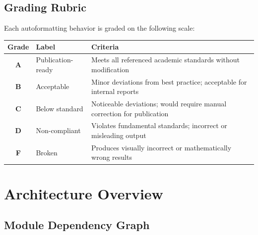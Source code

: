 \documentclass[11pt,a4paper]{article}
\begin{document}
\subsection{Grading Rubric}

Each autoformatting behavior is graded on the following scale:

\begin{center}
\begin{tabular}{c l p{7cm}}
\toprule
\textbf{Grade} & \textbf{Label} & \textbf{Criteria} \\
\midrule
\textcolor{okgreen}{\textbf{A}} & Publication-ready & Meets all referenced academic standards without modification \\
\textcolor{googblue}{\textbf{B}} & Acceptable & Minor deviations from best practice; acceptable for internal reports \\
\textcolor{warningyellow}{\textbf{C}} & Below standard & Noticeable deviations; would require manual correction for publication \\
\textcolor{googred}{\textbf{D}} & Non-compliant & Violates fundamental standards; incorrect or misleading output \\
\textcolor{criticalred}{\textbf{F}} & Broken & Produces visually incorrect or mathematically wrong results \\
\bottomrule
\end{tabular}
\end{center}

\section{Architecture Overview}

\subsection{Module Dependency Graph}
\end{document}
